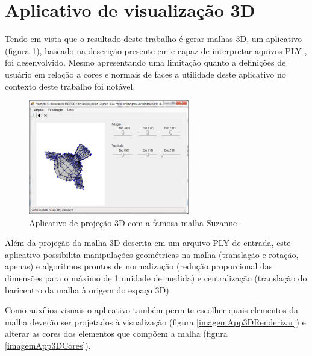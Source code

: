 	\section{Aplicativo de visualização 3D}
		\label{app3D}
		
		Tendo em vista que o resultado deste trabalho é gerar malhas 3D, um aplicativo (figura \ref{imagemApp3D}), baseado na descrição presente em \cite{compGraphsPrincPrat3ed} e capaz de interpretar aquivos PLY \cite{ply}, foi desenvolvido. Mesmo apresentando uma limitação quanto a definições de usuário em relação a cores e normais de faces a utilidade deste aplicativo no contexto deste trabalho foi notável.
		
		\begin{figure}[!htb]
			\centering
			\includegraphics[height=5cm]{imagens/printApp3D.png}
			\caption{Aplicativo de projeção 3D com a famosa malha Suzanne}
			\label{imagemApp3D}
		\end{figure}
		
		Além da projeção da malha 3D descrita em um arquivo PLY de entrada, este aplicativo possibilita manipulações geométricas na malha (translação e rotação, apenas) e algoritmos prontos de normalização (redução proporcional das dimensões para o máximo de 1 unidade de medida) e centralização (translação do baricentro da malha à origem do espaço 3D).
		
		Como auxílios visuais o aplicativo também permite escolher quais elementos da malha deverão ser projetados à visualização (figura \ref{imagemApp3DRenderizar}) e alterar as cores dos elementos que compõem a malha (figura \ref{imagemApp3DCores}).
		
